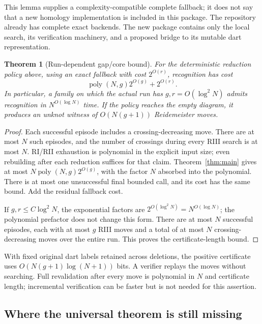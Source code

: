 \documentclass[11pt]{article}
\newtheorem{theorem}{Theorem}[section]
\theoremstyle{definition}
\newcommand{\poly}{\operatorname{poly}}
\begin{document}
This lemma supplies a complexity-compatible complete fallback; it does
not say that a new homology implementation is included in this package.
The repository already has complete exact backends. The new package
contains only the local search, its verification machinery, and a proposed
bridge to its mutable dart representation.

\begin{theorem}[Run-dependent gap/core bound]
\label{thm:gapcore}
For the deterministic reduction policy above, using an exact fallback
with cost $2^{O(r)}$, recognition has cost
\begin{equation}
 \poly(N,g)2^{O(g)}+2^{O(r)}.
 \label{eq:gapcore}
\end{equation}
In particular, a family on which the \emph{actual run} has
$g,r=O(\log^2 N)$ admits recognition in $N^{O(\log N)}$ time.
If the policy reaches the empty diagram, it produces an unknot witness
of $O(N(g+1))$ Reidemeister moves.
\end{theorem}

\begin{proof}
Each successful episode includes a crossing-decreasing move. There are
at most $N$ such episodes, and the number of crossings during every RIII
search is at most $N$. RI/RII exhaustion is polynomial in the explicit
input size; even rebuilding after each reduction suffices for that claim.
Theorem~\ref{thm:main} gives at most
$N\poly(N,g)2^{O(g)}$, with the factor $N$ absorbed into the polynomial.
There is at most one unsuccessful final bounded call, and its cost has
the same bound. Add the residual fallback cost.

If $g,r\le C\log^2N$, the exponential factors are
$2^{O(\log^2N)}=N^{O(\log N)}$; the polynomial prefactor does not
change this form. There are at most $N$ successful episodes, each with
at most $g$ RIII moves and a total of at most $N$ crossing-decreasing
moves over the entire run. This proves the certificate-length bound.
\end{proof}

With fixed original dart labels retained across deletions, the positive
certificate uses $O(N(g+1)\log(N+1))$ bits. A verifier replays the moves
without searching. Full revalidation after every move is polynomial in
$N$ and certificate length; incremental verification can be faster but
is not needed for this assertion.

\subsection{Where the universal theorem is still missing}
\end{document}
